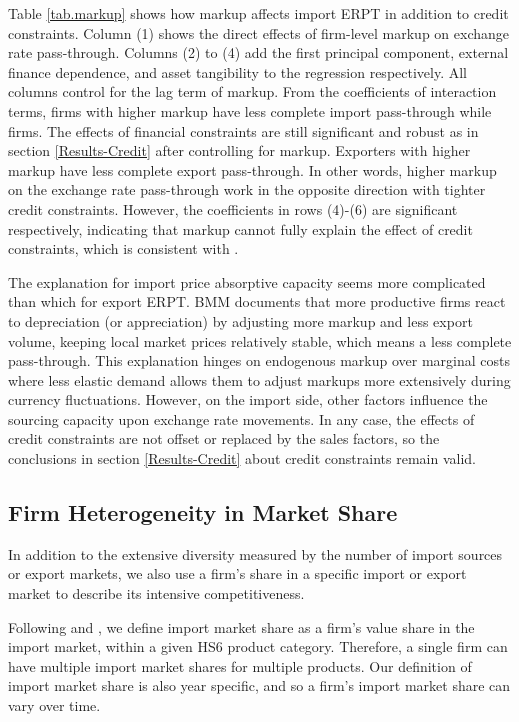\documentclass[12pt]{article}
\begin{document}
Table \ref{tab.markup} shows how markup affects import ERPT in addition to credit constraints. Column (1) shows the direct effects of firm-level markup on exchange rate pass-through. Columns (2) to (4) add the first principal component, external finance dependence, and asset tangibility to the regression respectively. All columns control for the lag term of markup. From the coefficients of interaction terms, firms with higher markup have less complete import pass-through while firms. The effects of financial constraints are still significant and robust as in section \ref{Results-Credit} after controlling for markup. Exporters with higher markup have less complete export pass-through. In other words, higher markup on the exchange rate pass-through work in the opposite direction with tighter credit constraints. However, the coefficients in rows (4)-(6) are significant respectively, indicating that markup cannot fully explain the effect of credit constraints, which is consistent with \cite{xu-guo2021}.

The explanation for import price absorptive capacity seems more complicated than which for export ERPT. BMM\cite{bmm2012} documents that more productive firms react to depreciation (or appreciation) by adjusting more markup and less export volume, keeping local market prices relatively stable, which means a less complete pass-through. This explanation hinges on endogenous markup over marginal costs where less elastic demand allows them to adjust markups more extensively during currency fluctuations. However, on the import side, other factors influence the sourcing capacity upon exchange rate movements. In any case, the effects of credit constraints are not offset or replaced by the sales factors, so the conclusions in section \ref{Results-Credit} about credit constraints remain valid.

\subsection{Firm Heterogeneity in Market Share}
In addition to the extensive diversity measured by the number of import sources or export markets, we also use a firm's share in a specific import or export market to describe its intensive competitiveness.

Following \cite{aik2014} and \cite{devereux2017}, we define import market share as a firm’s value share in the import market, within a given HS6 product category. Therefore, a single firm can have multiple import market shares for multiple products. Our definition of import market share is also year specific, and so a firm’s import market share can vary over time. 
\end{document}
